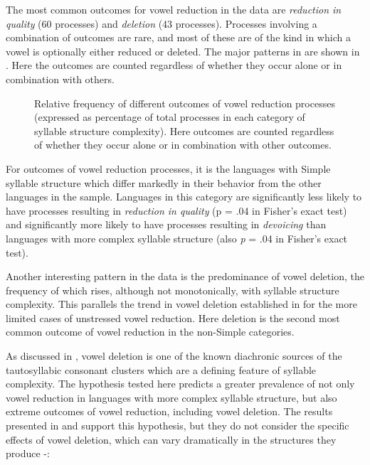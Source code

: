   The most common outcomes for vowel reduction in the data are \textit{reduction in quality} (60 processes) and \textit{deletion} (43 processes). Processes involving a combination of outcomes are rare, and most of these are of the kind in which a vowel is optionally either reduced or deleted. The major patterns in  are shown in . Here the outcomes are counted regardless of whether they occur alone or in combination with others.

  
\begin{figure}
\caption{\label{fig:6.4} Relative frequency of different outcomes of vowel reduction processes (expressed as percentage of total processes in each category of syllable structure complexity). Here outcomes are counted regardless of whether they occur alone or in combination with other outcomes.}
\end{figure}

  For outcomes of vowel reduction processes, it is the languages with Simple syllable structure which differ markedly in their behavior from the other languages in the sample. Languages in this category are significantly less likely to have processes resulting in \textit{reduction in quality} (p = .04 in Fisher’s exact test) and significantly more likely to have processes resulting in \textit{devoicing} than languages with more complex syllable structure (also \textit{p} = .04 in Fisher’s exact test).

  Another interesting pattern in the data is the predominance of vowel deletion, the frequency of which rises, although not monotonically, with syllable structure complexity. This parallels the trend in vowel deletion established in  for the more limited cases of unstressed vowel reduction. Here deletion is the second most common outcome of vowel reduction in the non-Simple categories. 

  As discussed in , vowel deletion is one of the known diachronic sources of the tautosyllabic consonant clusters which are a defining feature of syllable complexity. The hypothesis tested here predicts a greater prevalence of not only vowel reduction in languages with more complex syllable structure, but also extreme outcomes of vowel reduction, including vowel deletion. The results presented in  and  support this hypothesis, but they do not consider the specific effects of vowel deletion, which can vary dramatically in the structures they produce -:

